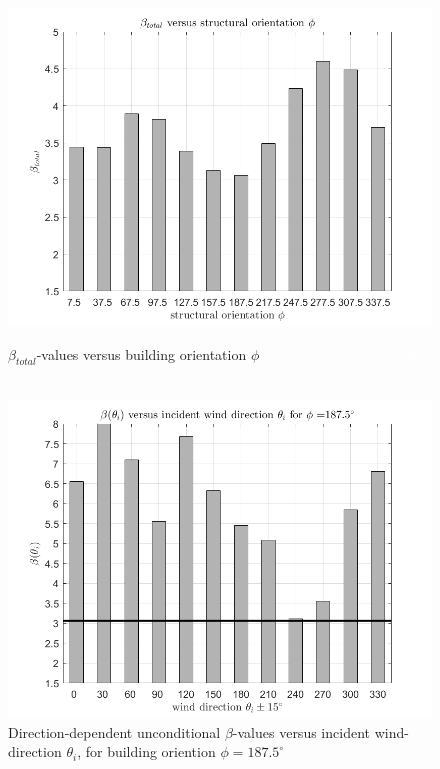 \begin{figure}[H]
	\begin{minipage}[]{0.5\textwidth}
		\centering
		\includegraphics[scale=0.4]{images/beta_total_orientation_G}
		\caption{$\beta_{total}$-values versus building orientation $\phi$ \textcolor{white}{$\beta_{total}$-values versus building orientation $\phi$} \textcolor{white}{$\beta_{total}$-values versus building orientation $\phi$}}
		\label{fig:total_reliability_all_directiosn}
	\end{minipage}
	\hspace{0.4cm}
	\begin{minipage}[]{0.5\textwidth}
		\includegraphics[scale=0.4]{images/unconditional_beta_values_G}
		\caption{Direction-dependent unconditional $\beta$-values versus incident wind-direction $\theta_i$, for building oriention $\phi=187.5^{\circ}$} \label{fig:direction_dependent_beta_values}
	\end{minipage}
\end{figure}


